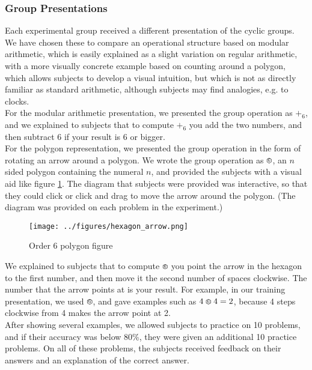 \documentclass[11pt]{article}
\def\hex{\mathrel{%
    \mathchoice{\HEX}{\HEX}{\scriptsize\HEX}{\tiny\HEX}%
}}
\def\HEX{{%
    \setbox0\hbox{\varhexagon}%
    \rlap{\hbox to \wd0{\hss\raisebox{1 pt}{\scaleobj{0.6}{6}}\hss}}\box0
}}
\begin{document}
\subsubsection{Group Presentations}
Each experimental group received a different presentation of the cyclic groups. We have chosen these to compare an operational structure based on modular arithmetic, which is easily explained as a slight variation on regular arithmetic, with a more visually concrete example based on counting around a polygon, which allows subjects to develop a visual intuition, but which is not as directly familiar as standard arithmetic, although subjects may find analogies, e.g. to clocks. \\[11pt] 
For the modular arithmetic presentation, we presented the group operation as $+_6$, and we explained to subjects that to compute $+_6$ you add the two numbers, and then subtract $6$ if your result is $6$ or bigger.\\[11pt]
For the polygon representation, we presented the group operation in the form of rotating an arrow around a polygon. We wrote the group operation as $\hex$, an $n$ sided polygon containing the numeral $n$, and provided the subjects with a visual aid like figure \ref{hexagonex}. The diagram that subjects were provided was interactive, so that they could click or click and drag to move the arrow around the polygon. (The diagram was provided on each problem in the experiment.)
\begin{figure}[H] \centering \texttt{[image: ../figures/hexagon\_arrow.png]} \caption{Order 6 polygon figure} \label{hexagonex} \end{figure} \noindent
We explained to subjects that to compute $\hex$ you point the arrow in the hexagon to the first number, and then move it the second number of spaces clockwise. The number that the arrow points at is your result. For example, in our training presentation, we used $\hex$, and gave examples such as $4 \hex 4 = 2$, because 4 steps clockwise from 4 makes the arrow point at 2. \\[11pt]
After showing several examples, we allowed subjects to practice on 10 problems, and if their accuracy was below 80\%, they were given an additional 10 practice problems. On all of these problems, the subjects received feedback on their answers and an explanation of the correct answer. 
\end{document}

